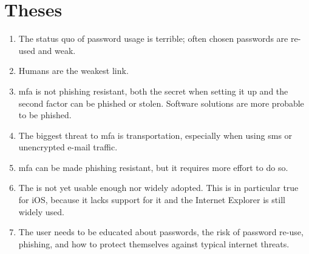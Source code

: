 \chapter*{Theses}
\thispagestyle{noheader}

\begin{enumerate}
	\setlength{\itemsep}{1cm}
	\item The status quo of password usage is terrible; often chosen passwords are re-used and weak.
	\item Humans are the weakest link.
	\item \Glsdesc{mfa} is not phishing resistant, both the secret when setting it up and the second factor can be phished or stolen. Software solutions are more probable to be phished.
	\item The biggest threat to \glsdesc{mfa} is transportation, especially when using \gls{sms} or unencrypted e-mail traffic.
	\item \Glsdesc{mfa} can be made phishing resistant, but it requires more effort to do so.
	\item The \wa{} is not yet usable enough nor widely adopted. This is in particular true for iOS, because it lacks support for it and the Internet Explorer is still widely used.
	\item The user needs to be educated about passwords, the risk of password re-use, phishing, and how to protect themselves against typical internet threats.
\end{enumerate}
